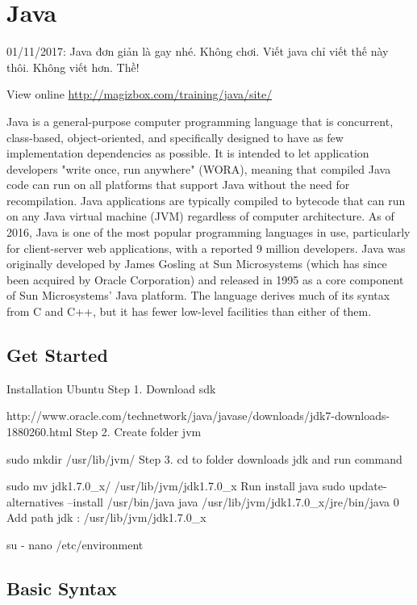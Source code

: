 \chapter{Java}

01/11/2017: Java đơn giản là gay nhé. Không chơi. Viết java chỉ viết thế này thôi. Không viết hơn. Thề!

View online \href{http://magizbox.com/training/java/site/}{http://magizbox.com/training/java/site/}

Java is a general-purpose computer programming language that is concurrent, class-based, object-oriented, and specifically designed to have as few implementation dependencies as possible. It is intended to let application developers "write once, run anywhere" (WORA), meaning that compiled Java code can run on all platforms that support Java without the need for recompilation. Java applications are typically compiled to bytecode that can run on any Java virtual machine (JVM) regardless of computer architecture. As of 2016, Java is one of the most popular programming languages in use, particularly for client-server web applications, with a reported 9 million developers. Java was originally developed by James Gosling at Sun Microsystems (which has since been acquired by Oracle Corporation) and released in 1995 as a core component of Sun Microsystems' Java platform. The language derives much of its syntax from C and C++, but it has fewer low-level facilities than either of them.

\section{Get Started}

Installation
Ubuntu
Step 1. Download sdk

http://www.oracle.com/technetwork/java/javase/downloads/jdk7-downloads-1880260.html
Step 2. Create folder jvm

sudo mkdir /usr/lib/jvm/
Step 3. cd to folder downloads jdk and run command

sudo mv jdk1.7.0_x/ /usr/lib/jvm/jdk1.7.0_x
Run install java
sudo update-alternatives --install /usr/bin/java java /usr/lib/jvm/jdk1.7.0_x/jre/bin/java 0
Add path jdk : /usr/lib/jvm/jdk1.7.0_x

su -
nano /etc/environment

\section{Basic Syntax}

